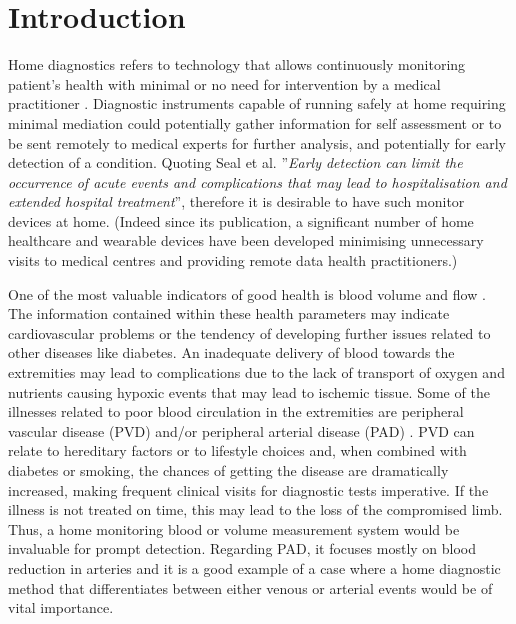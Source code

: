 
\chapter{Introduction}  %

\ifpdf
    \graphicspath{{Chapter1/Figs/Raster/}{Chapter1/Figs/PDF/}{Chapter1/Figs/}}
\else
    \graphicspath{{Chapter1/Figs/Vector/}{Chapter1/Figs/}}
\fi

Home diagnostics refers to technology that allows continuously monitoring patient's health with minimal or no need for intervention by a medical practitioner \cite{seal2007bringing} . Diagnostic instruments capable of running safely at home requiring minimal mediation could potentially gather information for self assessment or to be sent remotely to medical experts for further analysis, and potentially for early detection of a condition. Quoting Seal et al. \cite{seal2007bringing} ''\textit{Early detection can limit the occurrence of acute events and complications that may lead to hospitalisation and extended hospital treatment}'', therefore it is desirable to have such monitor devices at home. (Indeed since its publication, a significant number of home healthcare and wearable devices have been developed minimising unnecessary visits to medical centres and providing remote data health practitioners.) 

One of the most valuable indicators of good health is blood volume and flow \cite{bloodcirculation}. The information contained within these health parameters may indicate cardiovascular problems or the tendency of developing further issues related to other diseases like diabetes. An inadequate delivery of blood towards the extremities may lead to complications due to the lack of transport of oxygen and nutrients causing hypoxic events that may lead to ischemic tissue. Some of the illnesses related to poor blood circulation in the extremities are peripheral vascular disease (PVD) and/or peripheral arterial disease (PAD) \cite{novo2004critical}. PVD can relate to hereditary factors or to lifestyle choices and, when combined with diabetes or smoking, the chances of getting the disease are dramatically increased, making frequent clinical visits for diagnostic tests imperative. If the illness is not treated on time, this may lead to the loss of the compromised limb. Thus, a home monitoring blood or volume measurement system would be invaluable for prompt detection. Regarding PAD, it focuses mostly on blood reduction in arteries and it is a good example of a case where a home diagnostic method that differentiates between either venous or arterial events would be of vital importance. 


